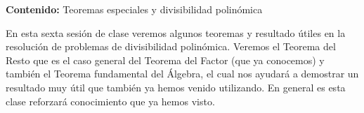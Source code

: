 {\Large
    \textbf{Contenido:} Teoremas especiales y divisibilidad polinómica
}

En esta sexta sesión de clase veremos algunos teoremas y resultado útiles en la resolución de problemas de divisibilidad polinómica.
Veremos el Teorema del Resto que es el caso general del Teorema del Factor (que ya conocemos) y también el Teorema fundamental del Álgebra, el
cual nos ayudará a demostrar un resultado muy útil que también ya hemos venido utilizando. En general es esta clase reforzará conocimiento que ya hemos visto.

\vspace{-2mm}